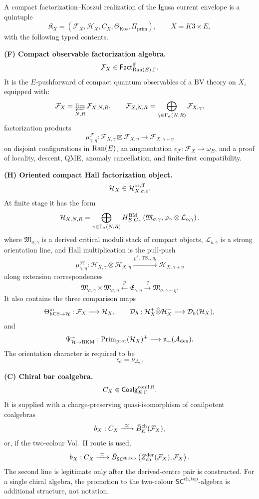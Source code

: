 \begin{definition}
\label{def:cell-eleven-five-datum}
A compact factorization--Koszul realization of the Igusa current
envelope is a quintuple
$$
\mathfrak K_X
=
\left(
\mathcal F_X,\mathcal H_X,C_X,\Theta_{\mathrm{Kos}},
\Pi_{\mathrm{prim}}
\right),
\qquad X=K3\times E,
$$
with the following typed contents.

\smallskip
\noindent
\textbf{(F) Compact observable factorization algebra.}
\[
\mathcal F_X\in\mathsf{Fact}^{\mathrm{ff}}_{\operatorname{Ran}(E),\Gamma}.
\]
It is the \(E\)-pushforward of compact quantum observables of a BV
theory on \(X\), equipped with:
$$
\mathcal F_X=\varprojlim_{N,R}\mathcal F_{X,N,R},
\qquad
\mathcal F_{X,N,R}
=\bigoplus_{\gamma\in\Gamma_{\sigma}(N,R)}
\mathcal F_{X,\gamma},
$$
factorization products
$$
\mu^{\mathcal F}_{\gamma,\eta}:
\mathcal F_{X,\gamma}\boxtimes\mathcal F_{X,\eta}
\longrightarrow
\mathcal F_{X,\gamma+\eta}
$$
on disjoint configurations in \(\operatorname{Ran}(E)\), an augmentation
\(\epsilon_{\mathcal F}:\mathcal F_X\to\omega_E\), and a proof of
locality, descent, QME, anomaly cancellation, and finite-first
compatibility.

\smallskip
\noindent
\textbf{(H) Oriented compact Hall factorization object.}
\[
\mathcal H_X\in\mathcal H^{\mathrm{or,ff}}_{X,\sigma,o}.
\]
At finite stage it has the form
$$
\mathcal H_{X,N,R}
=
\bigoplus_{\gamma\in\Gamma_{\sigma}(N,R)}
H^{\operatorname{BM}}_{E,G_\gamma}
\left(
\mathfrak M_{\sigma,\gamma},
\varphi_\gamma\otimes\mathcal L_{o,\gamma}
\right),
$$
where \(\mathfrak M_{\sigma,\gamma}\) is a derived critical moduli
stack of compact objects, \(\mathcal L_{o,\gamma}\) is a strong
orientation line, and Hall multiplication is the pull-push
$$
\mu^{\mathcal H}_{\gamma,\eta}:
\mathcal H_{X,\gamma}\otimes\mathcal H_{X,\eta}
\xrightarrow{\,p^*,\,\mathrm{TS}_o,\,q_!\,}
\mathcal H_{X,\gamma+\eta}
$$
along extension correspondences
$$
\mathfrak M_{\sigma,\gamma}\times\mathfrak M_{\sigma,\eta}
\xleftarrow{\ p\ }
\mathfrak E_{\gamma,\eta}
\xrightarrow{\ q\ }
\mathfrak M_{\sigma,\gamma+\eta}.
$$
It also contains the three comparison maps
$$
\Theta^{\mathrm{or}}_{\mathrm{hCS}\to\mathcal H}:
\mathcal F_X\longrightarrow\mathcal H_X,
\qquad
\mathcal D_\hbar:
\mathcal H_X^+\widehat{\otimes}\mathcal H_X^-
\longrightarrow
\mathcal D_\hbar(\mathcal H_X),
$$
and
$$
\Psi^+_{\mathcal H\to\mathrm{BKM}}:
\operatorname{Prim}_{\mathrm{prot}}(\mathcal H_X)^+
\longrightarrow
\mathfrak n_+(\mathcal A_{\mathrm{den}}).
$$
The orientation character is required to be
$$
\epsilon_o=\nu_{\Delta_5}.
$$

\smallskip
\noindent
\textbf{(C) Chiral bar coalgebra.}
\[
C_X\in\mathsf{Coalg}^{\mathrm{conil,ff}}_{E,\Gamma}.
\]
It is supplied with a charge-preserving quasi-isomorphism of conilpotent
coalgebras
$$
b_X:
C_X\xrightarrow{\ \simeq\ }
\bar B_E^{\mathrm{ch}}(\mathcal F_X),
$$
or, if the two-colour Vol.~II route is used,
$$
b_X:
C_X\xrightarrow{\ \simeq\ }
\bar B_{\mathsf{SC}^{\mathrm{ch,top}}}
\left(
Z^{\mathrm{der}}_{\mathrm{ch}}(\mathcal F_X),\mathcal F_X
\right).
$$
The second line is legitimate only after the derived-centre pair is
constructed.  For a single chiral algebra, the promotion to the
two-colour \(\mathsf{SC}^{\mathrm{ch,top}}\)-algebra is additional
structure, not notation.


\end{definition}
